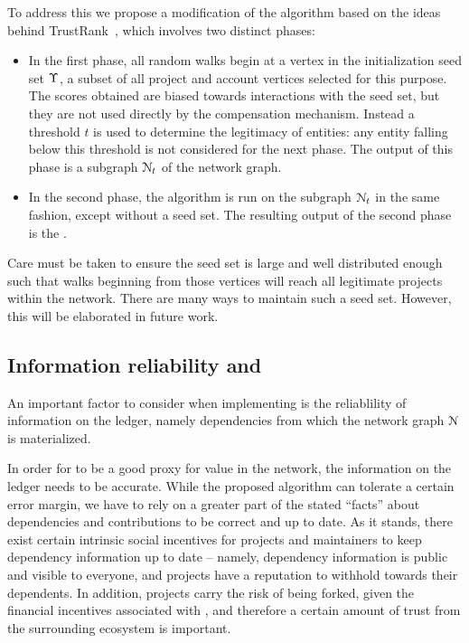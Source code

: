 To address this we propose a modification of the \pagerank{} algorithm based
on the ideas behind TrustRank~\cite{trustrank}, which involves two distinct
phases:

\begin{itemize}
\item In the first phase, all random walks begin at a vertex in the
  initialization seed set $\Upsilon$, a subset of all project and account
  vertices selected for this purpose.
  The scores obtained are biased towards interactions with the seed set, but
  they are not used directly by the compensation mechanism. Instead a threshold
  $t$ is used to determine the legitimacy of entities: any entity falling below
  this threshold is not considered for the next phase. The output of this phase
  is a subgraph $\mathcal{N}_t$ of the network graph.
\item In the second phase, the algorithm is run on the subgraph $\mathcal{N}_t$
  in the same fashion, except without a seed set. The resulting output of the
  second phase is the \osrank{}.
\end{itemize}
Care must be taken to ensure the seed set is large and well distributed enough
such that walks beginning from those vertices will reach all legitimate
projects within the network. There are many ways to maintain such a seed set.
However, this will be elaborated in future work.

\subsection{Information reliability and \osrank{}}

An important factor to consider when implementing \osrank{} is the reliablility
of information on the ledger, namely dependencies from which the
network graph $\mathcal{N}$ is materialized.

In order for \osrank{} to be a good proxy for value in the network, the
information on the ledger needs to be accurate. While the proposed algorithm
can tolerate a certain error margin, we have to rely on a greater part of the
stated ``facts'' about dependencies and contributions to be correct and up to
date. As it stands, there exist certain intrinsic social incentives for
projects and maintainers to keep dependency information up to date -- namely,
dependency information is public and visible to everyone, and projects have a
reputation to withhold towards their dependents. In addition, projects carry
the risk of being forked, given the financial incentives associated with
\osrank{}, and therefore a certain amount of trust from the surrounding
ecosystem is important.

